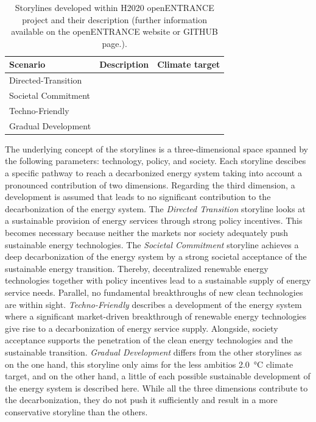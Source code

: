 
\begin{table}[H]
\centering
\caption{Storylines developed within H2020 openENTRANCE project and their description (further information available on the openENTRANCE website or GITHUB page.).}
\begin{tabular}{@{}lll@{}}
\toprule
Scenario            & Description & Climate target \\ \midrule
Directed-Transition &             &                \\
Societal Commitment &             &                \\
Techno-Friendly     &             &                \\
Gradual Development &             &                \\ \bottomrule
\end{tabular}
\end{table}



The underlying concept of the storylines is a three-dimensional space spanned by the following parameters: technology, policy, and society. Each storyline descibes a specific pathway to reach a decarbonized energy system taking into account a pronounced contribution of two dimensions. Regarding the third dimension, a development is assumed that leads to no significant contribution to the decarbonization of the energy system. The \textit{Directed Transition} storyline looks at a sustainable provision of energy services through strong policy incentives. This becomes necessary because neither the markets nor society adequately push sustainable energy technologies. The \textit{Societal Commitment} storyline achieves a deep decarbonization of the energy system by a strong societal acceptance of the sustainable energy transition. Thereby, decentralized renewable energy technologies together with policy incentives lead to a sustainable supply of energy service needs. Parallel, no fundamental breakthroughs of new clean technologies are within sight. \textit{Techno-Friendly} describes a development of the energy system where a significant market-driven breakthrough of renewable energy technologies give rise to a decarbonization of energy service supply. Alongside, society acceptance supports the penetration of the clean energy technologies and the sustainable transition. \textit{Gradual Development} differs from the other storylines as on the one hand, this storyline only aims for the less ambitios \SI{2.0}{\degreeCelsius} climate target, and on the other hand, a little of each possible sustainable development of the energy system is described here. While all the three dimensions contribute to the decarbonization, they do not push it sufficiently and result in a more conservative storyline than the others.\newline

